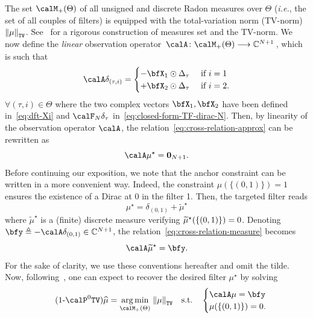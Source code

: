 The set $\posDisRadonMeasure$ of all unsigned and discrete Radon measures over $\Theta$ (\textit{i.e.}, the set of all couples of  filters) is equipped with the total-variation norm (TV-norm) $\normTV{\mu}$.
See~\cite{Rudin1987} for a rigorous construction of measures set and the TV-norm.
We now define the \emph{linear} observation operator $\kfuncdef{\opObs}{\posDisRadonMeasure}{\kC^{N+1}}$, which is such that
\begin{equation}
    \opObs\delta_{(\tau, i)}
    =
    \begin{cases}
        - \RecordedSignalDFT_1 \odot \paramVec{\tau}  &\text{ if } i=1 \\
        + \RecordedSignalDFT_2 \odot \paramVec{\tau}  &\text{ if } i=2.
    \end{cases}
\end{equation}
$\forall(\tau,i)\in\Theta$ where the two complex vectors $\RecordedSignalDFT_1, \RecordedSignalDFT_2$ have been defined in~\eqref{eq:dft-Xi} and $\calF_N\delta_\tau$ in~\eqref{eq:closed-form-TF-dirac-N}.
Then, by linearity of the observation operator $\opObs$, the relation~\eqref{eq:cross-relation-approx} can be rewritten as %
\begin{equation}
    \label{eq:cross-relation-measure}
    \opObs\mu^\star = \zeroVect_{N+1}
    .
\end{equation}
Before continuing our exposition, we note that the anchor constraint can be written in a more convenient way.
Indeed, the constraint $\mu(\{(0, 1)\})=1$ ensures the existence of a Dirac at $0$ in the filter 1.
Then, the targeted filter reads
\begin{equation}
    \mu^\star = \delta_{(0, 1)} + \widetilde{\mu}^\star
\end{equation}
where $\widetilde{\mu}^\star$ is a (finite) discrete measure verifying  $\widetilde{\mu}^\star\kparen{\{(0, 1)\}} = 0$.
Denoting $\bfy\triangleq-\opObs\delta_{(0, 1)}\in\kC^{N+1}$, the relation~\eqref{eq:cross-relation-measure} becomes
\begin{equation}
    \label{eq:cross-relation-measure-and-obs}
    \opObs\widetilde{\mu}^\star = \bfy
    .
\end{equation}
For the sake of clarity, we use these conventions hereafter and omit the tilde.
Now, following~\cite{Castro2012aa,Carlos2014}, one can expect to recover the desired filter $\mu^\star$ by solving
\begin{equation}
    \stepcounter{equation}
    \tag{\theequation-$\calP^0{\text{\texttt{TV}}}$}
    \label{eq:TV-BP}
    \widehat{\mu}
    =
    \kargmin_{\posDisRadonMeasure}
    \;
    \normTV{
        \mu
    }
    \quad
    \text{s.t.}
    \quad
    \begin{cases}
        \opObs\mu
        = \bfy \\
        \mu(\{(0, 1)\}) = 0.
    \end{cases}
\end{equation}

